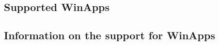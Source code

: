 

\subsection{Supported WinApps \gdauts{}}


\subsection{Information on the support for WinApps \gdauts{}}

